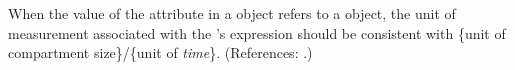 When the value of the attribute  in a \RateRule object
refers to a \Compartment object, the unit of measurement associated with
the \RateRule's  expression should be consistent with \{unit of
compartment size\}/\{unit of \emph{time}\}.  (References: .)
